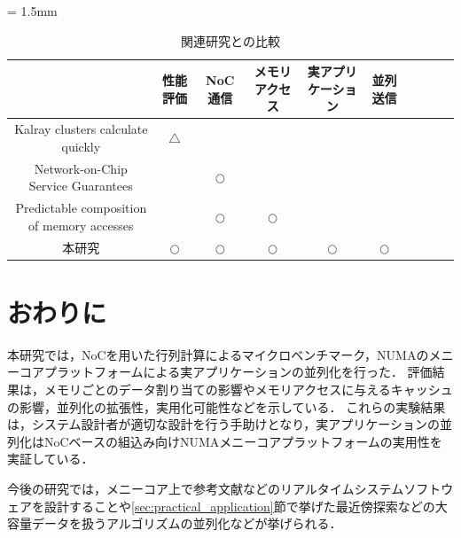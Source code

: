 \documentclass[submit,techrep]{ipsj_v2/UTF8/ipsj}
\begin{document}
\begin{table}[t]
  \caption{\label{tb:comparison_relatedwork}
    関連研究との比較}
  \centering
  \scriptsize	                    %
  \tabcolsep = 1.5mm              %
  \begin{tabular}{c|ccccccccc}
    \hline
    & 性能評価 & NoC通信 & メモリアクセス & 実アプリケーション & 並列送信 & \\
    \hline
    \hline
    Kalray clusters calculate quickly \cite{kanter2015kalray} & \(\triangle\) &  &  &  &  & \\
    Network-on-Chip Service Guarantees \cite{denet2017work} &  & \(\bigcirc\) &  &  &  & \\
    Predictable composition of memory accesses \cite{perret2016predictable} &  & \(\bigcirc\) & \(\bigcirc\) &  &  & \\
    本研究 & \(\bigcirc\) & \(\bigcirc\) & \(\bigcirc\) & \(\bigcirc\) & \(\bigcirc\) & \\
    \hline
  \end{tabular}
\end{table}

\section{おわりに}
\label{sec:conclusion}
本研究では，NoCを用いた行列計算によるマイクロベンチマーク，NUMAのメニーコアプラットフォームによる実アプリケーションの並列化を行った．
評価結果は，メモリごとのデータ割り当ての影響やメモリアクセスに与えるキャッシュの影響，並列化の拡張性，実用化可能性などを示している．
これらの実験結果は，システム設計者が適切な設計を行う手助けとなり，実アプリケーションの並列化はNoCベースの組込み向けNUMAメニーコアプラットフォームの実用性を実証している．

今後の研究では，メニーコア上で参考文献\cite{maruyama2016ros2}などのリアルタイムシステムソフトウェアを設計することや\ref{sec:practical_application}節で挙げた最近傍探索などの大容量データを扱うアルゴリズムの並列化などが挙げられる．



\end{document}
